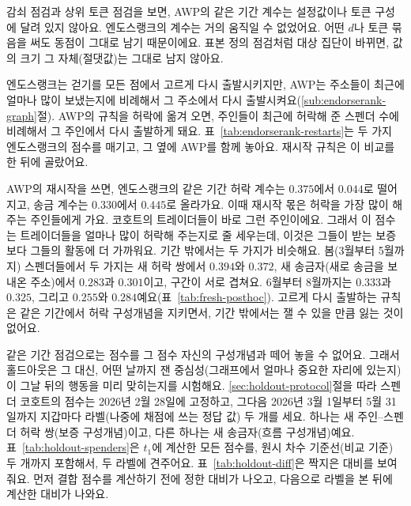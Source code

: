 감쇠 점검과 상위 토큰 점검을 보면, AWP의 같은 기간 계수는 설정값이나 토큰 구성에 달려 있지 않아요. 엔도스랭크의 계수는 거의 움직일 수 없었어요. 어떤 $d$나 토큰 묶음을 써도 동점이 그대로 남기 때문이에요. 표본 정의 점검처럼 대상 집단이 바뀌면, 값의 크기 그 자체(절댓값)는 그대로 남지 않아요.


엔도스랭크는 걷기를 모든 점에서 고르게 다시 출발시키지만, AWP는 주소들이 최근에 얼마나 많이 보냈는지에 비례해서 그 주소에서 다시 출발시켜요(\ref{sub:endorserank-graph}절). AWP의 규칙을 허락에 옮겨 오면, 주인들이 최근에 허락해 준 스펜더 수에 비례해서 그 주인에서 다시 출발하게 돼요. 표~\ref{tab:endorserank-restarts}는 두 가지 엔도스랭크의 점수를 매기고, 그 옆에 AWP를 함께 놓아요. 재시작 규칙은 이 비교를 한 뒤에 골랐어요.



AWP의 재시작을 쓰면, 엔도스랭크의 같은 기간 허락 계수는 $0.375$에서 $0.044$로 떨어지고, 송금 계수는 $0.330$에서 $0.445$로 올라가요. 이때 재시작 몫은 허락을 가장 많이 해 주는 주인들에게 가요. 코호트의 트레이더들이 바로 그런 주인이에요. 그래서 이 점수는 트레이더들을 얼마나 많이 허락해 주는지로 줄 세우는데, 이것은 그들이 받는 보증보다 그들의 활동에 더 가까워요. 기간 밖에서는 두 가지가 비슷해요. 봄(3월부터 5월까지) 스펜더들에서 두 가지는 새 허락 쌍에서 $0.394$와 $0.372$, 새 송금자(새로 송금을 보내온 주소)에서 $0.283$과 $0.301$이고, 구간이 서로 겹쳐요. 6월부터 8월까지는 $0.333$과 $0.325$, 그리고 $0.255$와 $0.284$예요(표~\ref{tab:fresh-posthoc}). 고르게 다시 출발하는 규칙은 같은 기간에서 허락 구성개념을 지키면서, 기간 밖에서는 잴 수 있을 만큼 잃는 것이 없어요.


같은 기간 점검으로는 점수를 그 점수 자신의 구성개념과 떼어 놓을 수 없어요. 그래서 홀드아웃은 그 대신, 어떤 날까지 잰 중심성(그래프에서 얼마나 중요한 자리에 있는지)이 그날 뒤의 행동을 미리 맞히는지를 시험해요. \ref{sec:holdout-protocol}절을 따라 스펜더 코호트의 점수는 2026년 2월 28일에 고정하고, 그다음 2026년 3월 1일부터 5월 31일까지 지갑마다 라벨(나중에 채점에 쓰는 정답 값) 두 개를 세요. 하나는 새 주인--스펜더 허락 쌍(보증 구성개념)이고, 다른 하나는 새 송금자(흐름 구성개념)예요. 표~\ref{tab:holdout-spenders}은 $t_1$에 계산한 모든 점수를, 원시 차수 기준선(비교 기준) 두 개까지 포함해서, 두 라벨에 견주어요. 표~\ref{tab:holdout-diff}은 짝지은 대비를 보여 줘요. 먼저 결합 점수를 계산하기 전에 정한 대비가 나오고, 다음으로 라벨을 본 뒤에 계산한 대비가 나와요.

